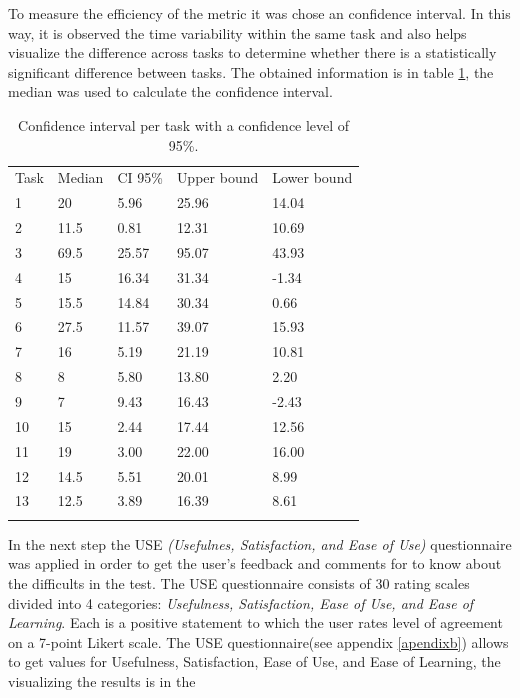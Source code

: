 To measure the efficiency of the metric it was chose an confidence interval.  In
this way, it is observed the time variability within the same task and  also
helps visualize the difference across tasks to determine whether there is a
statistically significant difference between tasks. The obtained information is
in table \ref{tab:ic}, the median was used to calculate the confidence interval.
\begin{table}
\centering
\small
\captionsetup{font=footnotesize}
\caption{Confidence interval per task with a confidence level of 95\%. }
\label{tab:ic}    
\begin{tabular}{lllll}
\hline\noalign{\smallskip}
Task  & Median & CI 95\% & Upper bound & Lower bound  \\
\noalign{\smallskip}\hline\noalign{\smallskip}
1 &    20         & 5.96  & 25.96 & 14.04  \\
2 &    11.5      & 0.81  & 12.31  & 10.69   \\
3 &    69.5      &  25.57   &  95.07  &  43.93   \\
4 &    15        & 16.34  &  31.34  &  -1.34   \\
5 &    15.5     &  14.84  &  30.34  &  0.66  \\
6 &     27.5    &   11.57  &  39.07  &  15.93    \\
7 &     16       &  5.19  & 21.19  &  10.81   \\
8 &     8         &   5.80  &  13.80  & 2.20 \\
9 &     7         & 9.43  &  16.43  &  -2.43  \\
10 &   15       &   2.44  &  17.44   &  12.56   \\
11 &   19       &  3.00  &  22.00  &  16.00   \\
12 &   14.5    &  5.51  &  20.01  &  8.99   \\
13 &   12.5    &  3.89  &  16.39  &  8.61    \\
\noalign{\smallskip}\hline
\end{tabular}
\end{table}
In the next step the USE \textit{(Usefulnes, Satisfaction, and Ease of Use)}
questionnaire \cite{morris2001experience} was applied in order to get the user's
feedback and comments for to know about the difficults in the test.  The USE
questionnaire consists of 30 rating scales divided into 4 categories:
\textit{Usefulness, Satisfaction, Ease of Use, and Ease of Learning}. Each is a positive
statement to which the user rates level of agreement on a 7-point Likert scale.
The USE questionnaire(see appendix \ref{apendixb}) allows to get values for Usefulness, Satisfaction, Ease of Use, and Ease of Learning, the visualizing the results is in the
